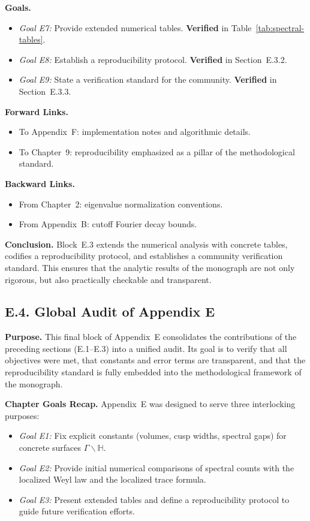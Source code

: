 \noindent \textbf{Goals.}
\begin{itemize}
  \item \emph{Goal E7:} Provide extended numerical tables.
  \textbf{Verified} in Table~\ref{tab:spectral-tables}.  
  \item \emph{Goal E8:} Establish a reproducibility protocol.
  \textbf{Verified} in Section~E.3.2.  
  \item \emph{Goal E9:} State a verification standard for the community.
  \textbf{Verified} in Section~E.3.3.  
\end{itemize}

\noindent \textbf{Forward Links.}
\begin{itemize}
  \item To Appendix~F: implementation notes and algorithmic details.  
  \item To Chapter~9: reproducibility emphasized as a pillar of the
  methodological standard.  
\end{itemize}

\noindent \textbf{Backward Links.}
\begin{itemize}
  \item From Chapter~2: eigenvalue normalization conventions.  
  \item From Appendix~B: cutoff Fourier decay bounds.  
\end{itemize}

\medskip
\noindent \textbf{Conclusion.}
Block~E.3 extends the numerical analysis with concrete tables, codifies a
reproducibility protocol, and establishes a community verification standard.
This ensures that the analytic results of the monograph are not only rigorous,
but also practically checkable and transparent.

\subsection*{E.4. Global Audit of Appendix E}

\noindent \textbf{Purpose.}
This final block of Appendix~E consolidates the contributions of the preceding
sections (E.1--E.3) into a unified audit. Its goal is to verify that all objectives
were met, that constants and error terms are transparent, and that the
reproducibility standard is fully embedded into the methodological framework
of the monograph.

\medskip
\noindent \textbf{Chapter Goals Recap.}
Appendix~E was designed to serve three interlocking purposes:
\begin{itemize}
  \item \emph{Goal E1:} Fix explicit constants (volumes, cusp widths, spectral gaps)
  for concrete surfaces $\Gamma\backslash \mathbb H$.  
  \item \emph{Goal E2:} Provide initial numerical comparisons of spectral counts
  with the localized Weyl law and the localized trace formula.  
  \item \emph{Goal E3:} Present extended tables and define a reproducibility
  protocol to guide future verification efforts.  
\end{itemize}


